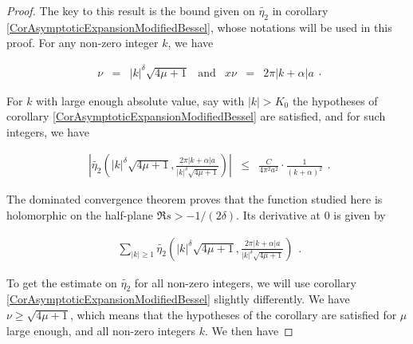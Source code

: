\documentclass{jams-l}
\theoremstyle{definition}
\theoremstyle{remark}
\numberwithin{equation}{section}
\begin{document}
            \begin{proof}
            
                The key to this result is the bound given on $\widetilde{\eta_2}$ in corollary \ref{CorAsymptoticExpansionModifiedBessel}, whose notations will be used in this proof. For any non-zero integer $k$, we have
                
                \[ \begin{array}{lllclll}   
                        \nu & = & \left \vert k \right \vert^{\delta} \sqrt{4 \mu + 1} & \text{and} & x \nu & = & 2 \pi \left \vert k + \alpha \right \vert a
                    \end{array} . \]
                
                \noindent For $k$ with large enough absolute value, say with $\left \vert k \right \vert > K_0$ the hypotheses of corollary \ref{CorAsymptoticExpansionModifiedBessel} are satisfied, and for such integers, we have
                
                \[ \begin{array}{lll}
                        \left \vert \widetilde{\eta_2} \left( \left \vert k \right \vert^{\delta} \sqrt{4 \mu + 1}, \frac{2 \pi \left \vert k + \alpha \right \vert a}{\left \vert k \right \vert^{\delta} \sqrt{4 \mu + 1}} \right) \right \vert & \leqslant & \frac{C}{4 \pi^2 a^2} \cdot \frac{1}{\left( k + \alpha \right)^2}
                    \end{array} . \]
                
                \noindent The dominated convergence theorem proves that the function studied here is holomorphic on the half-plane $\Re s > - 1/\left( 2 \delta \right)$. Its derivative at $0$ is given by
                
                \[ \begin{array}{l}
                        \sum\limits_{\left \vert k \right \vert \geqslant 1} \widetilde{\eta_2} \left( \left \vert k \right \vert^{\delta} \sqrt{4 \mu + 1}, \frac{2 \pi \left \vert k + \alpha \right \vert a}{\left \vert k \right \vert^{\delta} \sqrt{4 \mu + 1}} \right)
                    \end{array} . \]
                
                \noindent To get the estimate on $\widetilde{\eta_2}$ for all non-zero integers, we will use corollary \ref{CorAsymptoticExpansionModifiedBessel} slightly differently. We have $\nu \geqslant \sqrt{4 \mu + 1}$, which means that the hypotheses of the corollary are satisfied for $\mu$ large enough, and all non-zero integers $k$. We then have
                

\end{proof}
\end{document}
